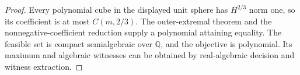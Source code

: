 \begin{proof}
Every polynomial cube in the displayed unit sphere has $H^{2/3}$ norm one, so its coefficient is at most $C(m,2/3)$. The outer-extremal theorem and the nonnegative-coefficient reduction supply a polynomial attaining equality. The feasible set is compact semialgebraic over $\mathbb Q$, and the objective is polynomial. Its maximum and algebraic witnesses can be obtained by real-algebraic decision and witness extraction.
\end{proof}
